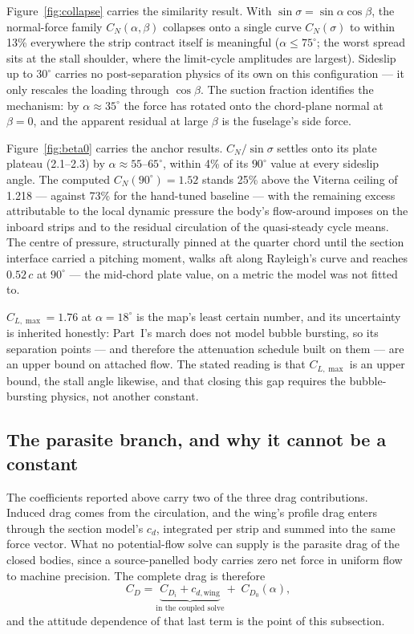 \documentclass[submit]{aiaa-tc}
\begin{document}
Figure~\ref{fig:collapse} carries the similarity result. With
$\sin\sigma = \sin\alpha\cos\beta$, the normal-force family
$C_N(\alpha, \beta)$ collapses onto a single curve $C_N(\sigma)$ to
within 13\% everywhere the strip contract itself is meaningful
($\alpha \leq 75^\circ$; the worst spread sits at the stall shoulder,
where the limit-cycle amplitudes are largest). Sideslip up to $30^\circ$
carries no post-separation physics of its own on this configuration ---
it only rescales the loading through $\cos\beta$. The suction fraction
identifies the mechanism: by $\alpha \approx 35^\circ$ the force has
rotated onto the chord-plane normal at $\beta = 0$, and the apparent
residual at large $\beta$ is the fuselage's side force.

Figure~\ref{fig:beta0} carries the anchor results. $C_N/\sin\sigma$
settles onto its plate plateau (2.1--2.3) by $\alpha \approx
55$--$65^\circ$, within 4\% of its $90^\circ$ value at every sideslip
angle. The computed $C_N(90^\circ) = 1.52$ stands 25\% above the
Viterna ceiling of 1.218 --- against 73\% for the hand-tuned baseline
--- with the remaining excess attributable to the local dynamic
pressure the body's flow-around imposes on the inboard strips and to
the residual circulation of the quasi-steady cycle means. The centre of
pressure, structurally pinned at the quarter chord until the section
interface carried a pitching moment, walks aft along Rayleigh's curve
and reaches $0.52\,c$ at $90^\circ$ --- the mid-chord plate value, on a
metric the model was not fitted to.

$C_{L,\max} = 1.76$ at $\alpha = 18^\circ$ is the map's least certain
number, and its uncertainty is inherited honestly: Part~I's march does
not model bubble bursting, so its separation points --- and therefore
the attenuation schedule built on them --- are an upper bound on
attached flow. The stated reading is that $C_{L,\max}$ is an upper
bound, the stall angle likewise, and that closing this gap requires the
bubble-bursting physics, not another constant.

\subsection{The parasite branch, and why it cannot be a constant}
\label{sec:parasite}

The coefficients reported above carry two of the three drag
contributions. Induced drag comes from the circulation, and the wing's
profile drag enters through the section model's $c_d$, integrated per
strip and summed into the same force vector. What no potential-flow
solve can supply is the parasite drag of the closed bodies, since a
source-panelled body carries zero net force in uniform flow to machine
precision. The complete drag is therefore
\begin{equation}
  C_D = \underbrace{C_{D_i} + c_{d,\mathrm{wing}}}_{\text{in the coupled
    solve}} + \;C_{D_0}(\alpha),
  \label{eq:cd-total}
\end{equation}
and the attitude dependence of that last term is the point of this
subsection.
\end{document}
